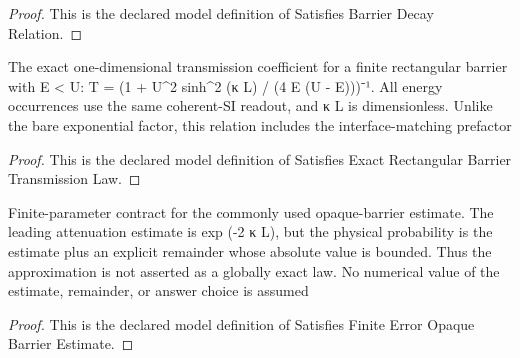 \begin{proof}
  This is the declared model definition of Satisfies Barrier Decay Relation.
\end{proof}
\begin{definition}
  \label{def:physics:phyx-mini-0533:phyxminiproblems-problemphyxmini0533-satisfiesexactrectangularbarriertransmissionlaw}
  The exact one-dimensional transmission coefficient for a finite rectangular barrier with E < U: T = (1 + U\textasciicircum{}2 sinh\textasciicircum{}2 (κ L) / (4 E (U - E)))⁻¹. All energy occurrences use the same coherent-SI readout, and κ L is dimensionless. Unlike the bare exponential factor, this relation includes the interface-matching prefactor
\end{definition}
\begin{proof}
  This is the declared model definition of Satisfies Exact Rectangular Barrier Transmission Law.
\end{proof}
\begin{definition}
  \label{def:physics:phyx-mini-0533:phyxminiproblems-problemphyxmini0533-satisfiesfiniteerroropaquebarrierestimate}
  Finite-parameter contract for the commonly used opaque-barrier estimate. The leading attenuation estimate is exp (-2 κ L), but the physical probability is the estimate plus an explicit remainder whose absolute value is bounded. Thus the approximation is not asserted as a globally exact law. No numerical value of the estimate, remainder, or answer choice is assumed
\end{definition}
\begin{proof}
  This is the declared model definition of Satisfies Finite Error Opaque Barrier Estimate.
\end{proof}
